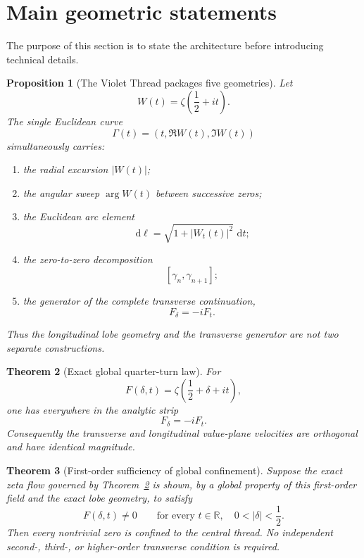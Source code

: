 \documentclass[11pt]{article}
\newtheorem{theorem}{Theorem}[section]
\newtheorem{proposition}[theorem]{Proposition}
\theoremstyle{definition}
\newcommand{\dd}{\,\mathrm d}
\newcommand{\R}{\mathbb R}
\begin{document}
\tableofcontents
\newpage

\section{Main geometric statements}

The purpose of this section is to state the architecture before introducing
technical details.

\begin{proposition}[The Violet Thread packages five geometries]\label{prop:package}
Let
\[
W(t)=\zeta\!\left(\frac12+it\right).
\]
The single Euclidean curve
\[
\Gamma(t)=(t,\Re W(t),\Im W(t))
\]
simultaneously carries:
\begin{enumerate}[leftmargin=1.8em]
\item the radial excursion $|W(t)|$;
\item the angular sweep $\arg W(t)$ between successive zeros;
\item the Euclidean arc element
\[
\dd\ell=\sqrt{1+|W_t(t)|^2}\,\dd t;
\]
\item the zero-to-zero decomposition
\[
[\gamma_n,\gamma_{n+1}];
\]
\item the generator of the complete transverse continuation,
\[
F_\delta=-iF_t.
\]
\end{enumerate}
Thus the longitudinal lobe geometry and the transverse generator are not two
separate constructions.
\end{proposition}

\begin{theorem}[Exact global quarter-turn law]\label{thm:quarter-main}
For
\[
F(\delta,t)=\zeta\!\left(\frac12+\delta+it\right),
\]
one has everywhere in the analytic strip
\[
\boxed{F_\delta=-iF_t.}
\]
Consequently the transverse and longitudinal value-plane velocities are
orthogonal and have identical magnitude.
\end{theorem}

\begin{theorem}[First-order sufficiency of global confinement]\label{thm:firstorder-suff}
Suppose the exact zeta flow governed by Theorem~\ref{thm:quarter-main} is
shown, by a global property of this first-order field and the exact lobe
geometry, to satisfy
\[
F(\delta,t)\neq0
\qquad
\text{for every }t\in\R,\quad 0<|\delta|<\frac12.
\]
Then every nontrivial zero is confined to the central thread.  No independent
second-, third-, or higher-order transverse condition is required.
\end{theorem}
\end{document}
